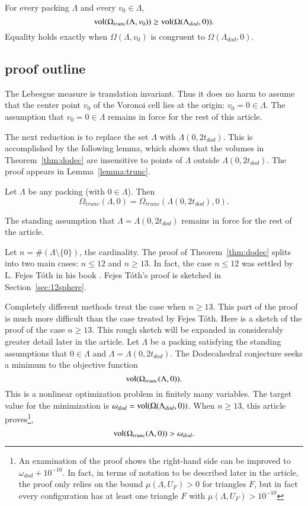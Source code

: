 \begin{theorem}\label{thm:dodec}
For every packing $\Lambda$ and every $v_0\in\Lambda$,
   $$
   {\operatorname{vol}}(\Omega_{trunc}(\Lambda,v_0))\ge {\operatorname{vol}}(\Omega(\Lambda_{dod},0)).
   $$
Equality holds exactly when $\Omega(\Lambda,v_0)$ is congruent to
$\Omega(\Lambda_{dod},0)$.
\end{theorem}





\subsection{proof outline}

The Lebesgue measure is translation invariant.  Thus it does no
harm to assume that the center point $v_0$ of the Voronoi cell
lies at the origin: $v_0 = 0 \in \Lambda$.  The assumption that
$v_0=0 \in\Lambda$ remains in force for the rest of this article.


The next reduction is to replace the set $\Lambda$ with $\Lambda(0,2t_{dod})$.
This is accomplished by the following lemma, which shows that the
volumes in Theorem~\ref{thm:dodec} are insensitive to points of $\Lambda$
outside $\Lambda(0,2t_{dod})$.  The proof appears in Lemma~\ref{lemma:trunc}.


\begin{lemma} Let $\Lambda$ be any packing (with $0\in \Lambda$).
Then
$$\Omega_{trunc}(\Lambda,0) = \Omega_{trunc}(\Lambda(0,2t_{dod}),0).$$
\end{lemma}

The standing assumption that $\Lambda=\Lambda(0,2t_{dod})$ remains in force
for the rest of the article.

Let $n=\#(\Lambda\setminus\{0\})$, the cardinality.
The proof of Theorem~\ref{thm:dodec}
splits into two main cases: $n\le 12$ and $n\ge 13$.
  In fact, the case $n\le 12$ was
settled by L. Fejes T\'oth in his book \cite{Toth2}.  Fejes T\'oth's proof
is sketched in Section~\ref{sec:12sphere}.

Completely different methods treat the case when $n\ge 13$.  
This part of the proof is
much more difficult than the case treated by Fejes T\'oth.
Here is a sketch of the proof of the case $n\ge 13$.   This
rough sketch will be expanded in considerably greater detail later
in the article.
Let $\Lambda$ be a packing satisfying the standing assumptions
that $0\in\Lambda$ and $\Lambda = \Lambda(0,2t_{dod})$.
The Dodecahedral conjecture seeks a minimum to the objective function 
$$
{\operatorname{vol}}(\Omega_{trunc}(\Lambda,0)).
$$
This is a nonlinear optimization problem in finitely many variables.
The target value for the minimization is $\omega_{dod}={\operatorname{vol}}(\Omega(\Lambda_{dod},0))$.  When $n\ge 13$, this article proves\footnote{An examination of the proof shows the right-hand side can be improved to $\omega_{dod}+10^{-10}$.  In fact, in terms of notation to be described later in the article, the proof only
relies on the bound $\mu(\Lambda,U_F) >0$ for triangles $F$, but in fact every configuration has at least one triangle $F$ with $\mu(\Lambda,U_F) > 10^{-10}$},
   $$
   {\operatorname{vol}}(\Omega_{trunc}(\Lambda,0))  > \omega_{dod}.
   $$



